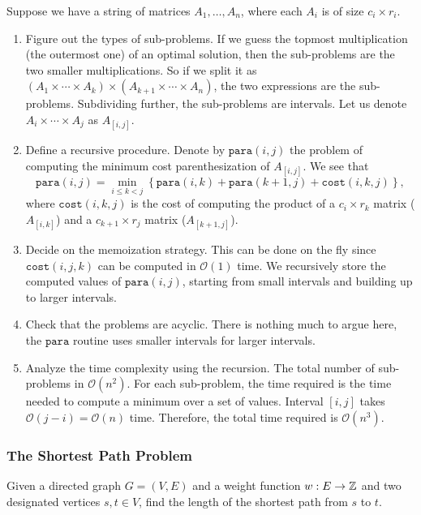 Suppose we have a string of matrices $A_1,\ldots,A_n$, where each $A_i$ is of size $c_i\times r_i$.
\begin{enumerate}
	\item Figure out the types of sub-problems. If we guess the topmost multiplication (the outermost one) of an optimal solution, then the sub-problems are the two smaller multiplications. So if we split it as $(A_1\times\cdots\times A_k)\times(A_{k+1}\times\cdots\times A_n)$, the two expressions are the sub-problems. Subdividing further, the sub-problems are intervals. Let us denote $A_i\times\cdots\times A_j$ as $A_{[i,j]}$.

	\item Define a recursive procedure. Denote by $\texttt{para}(i,j)$ the problem of computing the minimum cost parenthesization of $A_{[i,j]}$. We see that
	\[ \texttt{para}(i,j) = \min_{i\leq k<j} \left\{\texttt{para}(i,k) + \texttt{para}(k+1,j) + \texttt{cost}(i,k,j) \right\}, \]
	where $\texttt{cost}(i,k,j)$ is the cost of computing the product of a $c_i\times r_k$ matrix ($A_{[i,k]}$) and a $c_{k+1}\times r_j$ matrix ($A_{[k+1,j]}$).

	\item Decide on the memoization strategy. This can be done on the fly since $\texttt{cost}(i,j,k)$ can be computed in $\mathcal{O}(1)$ time. We recursively store the computed values of $\texttt{para}(i,j)$, starting from small intervals and building up to larger intervals.

	\item Check that the problems are acyclic. There is nothing much to argue here, the $\texttt{para}$ routine uses smaller intervals for larger intervals.

	\item Analyze the time complexity using the recursion. The total number of sub-problems in $\mathcal{O}(n^2)$. For each sub-problem, the time required is the time needed to compute a minimum over a set of values. Interval $[i,j]$ takes $\mathcal{O}(j-i)=\mathcal{O}(n)$ time. Therefore, the total time required is $\mathcal{O}(n^3)$.
\end{enumerate}

\subsubsection{The Shortest Path Problem}

Given a directed graph $G=(V,E)$ and a weight function $w:E\to\mathbb{Z}$ and two designated vertices $s,t\in V$, find the length of the shortest path from $s$ to $t$.\\

